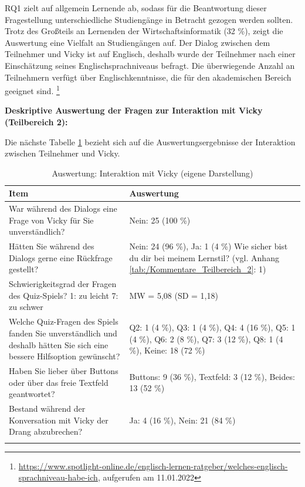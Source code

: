 RQ1 zielt auf allgemein Lernende ab, sodass für die Beantwortung dieser Fragestellung unterschiedliche 
Studiengänge in Betracht gezogen werden sollten.
Trotz des Großteils an Lernenden der Wirtschaftsinformatik (32 \%), zeigt die 
Auswertung eine Vielfalt an Studiengängen auf.
Der Dialog zwischen dem Teilnehmer und Vicky ist auf Englisch, deshalb wurde der Teilnehmer nach einer Einschätzung seines Englischsprachniveaus befragt.
Die überwiegende Anzahl an Teilnehmern verfügt über Englischkenntnisse, die für den akademischen
Bereich geeignet sind. \footnote{\url{https://www.spotlight-online.de/englisch-lernen-ratgeber/welches-englisch-sprachniveau-habe-ich}, aufgerufen am 11.01.2022}

\textbf{Deskriptive Auswertung der Fragen zur Interaktion mit Vicky (Teilbereich 2): }

Die nächste Tabelle \ref{tab:/Interaktion_mit_Vicky} bezieht sich auf die Auswertungsergebnisse der Interaktion zwischen Teilnehmer und Vicky.
\begingroup
\footnotesize 
\begin{longtable}{|m{4cm}|m{10cm}|}
    \hline
    \rowcolor[HTML]{EFEFEF} 
    \centering \textbf{Item} & \centering \arraybackslash \textbf{Auswertung}\\    \hline \hline
    \centering War während des Dialogs eine Frage von Vicky für Sie unverständlich?  &  Nein: 25 (100 \%)         \\ \hline
    \centering Hätten Sie während des Dialogs gerne eine Rückfrage gestellt? & Nein: 24 (96 \%), Ja: 1 (4 \%) Wie sicher bist du dir bei meinem Lernstil? (vgl. Anhang \ref{tab:/Kommentare_Teilbereich_2}: 1)          \\ \hline
    \centering Schwierigkeitsgrad der Fragen des Quiz-Spiels? 1: zu leicht 7: zu schwer & MW = 5,08 (SD = 1,18)          \\ \hline
    \centering Welche Quiz-Fragen des Spiels fanden Sie unverständlich und deshalb hätten Sie sich eine bessere Hilfsoption gewünscht? & Q2: 1 (4 \%), Q3: 1 (4 \%), Q4: 4 (16 \%), Q5: 1 (4 \%), Q6: 2 (8 \%), Q7: 3 (12 \%), Q8: 1 (4 \%), Keine: 18 (72 \%)  \\ \hline    
    \centering  Haben Sie lieber über Buttons oder über das freie Textfeld geantwortet? & Buttons: 9 (36 \%), Textfeld: 3 (12 \%), Beides: 13 (52 \%)         \\ \hline    
    \centering \arraybackslash Bestand während der Konversation mit Vicky der Drang abzubrechen?  & Ja: 4 (16 \%), Nein: 21 (84 \%)          \\ \hline
    \caption[Auswertung: Interaktion mit Vicky]{Auswertung: Interaktion mit Vicky (eigene Darstellung)} 
    \label{tab:/Interaktion_mit_Vicky}
\end{longtable}
\endgroup

